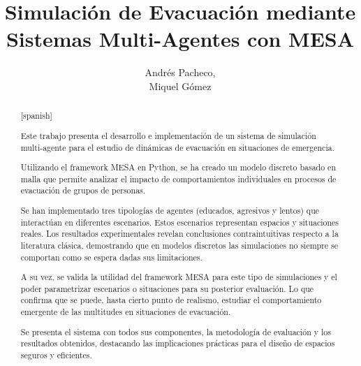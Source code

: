 \documentclass[11pt,spanish,listoffigures,listoftables]{tfgetsinf}
\title{Simulación de Evacuación mediante Sistemas Multi-Agentes con MESA}
\author{Andrés Pacheco, \\ Miquel Gómez}
\begin{document}
 




\begin{abstract}[spanish]

Este trabajo presenta el desarrollo e implementación de un sistema de simulación multi-agente para el estudio de dinámicas de evacuación en situaciones de emergencia.

Utilizando el framework MESA en Python, se ha creado un modelo discreto basado en malla que permite analizar el impacto de comportamientos individuales en procesos de evacuación de grupos de personas.

Se han implementado tres tipologías de agentes (educados, agresivos y lentos) que interactúan en diferentes escenarios. Estos escenarios representan espacios y situaciones reales. Los resultados experimentales revelan conclusiones contraintuitivas respecto a la literatura clásica, demostrando que en modelos discretos las simulaciones no siempre se comportan como se espera dadas sus limitaciones. 

A su vez, se valida la utilidad del framework MESA para este tipo de simulaciones y el poder parametrizar escenarios o situaciones para su posterior evaluación. Lo que confirma que se puede, hasta cierto punto de realismo, estudiar el comportamiento emergente de las multitudes en situaciones de evacuación.

Se presenta el sistema con todos sus componentes, la metodología de evaluación y los resultados obtenidos, destacando las implicaciones prácticas para el diseño de espacios seguros y eficientes.

\end{abstract}


\clearpage
\tableofcontents
\end{document}
